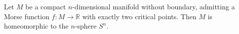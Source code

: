 Let $M$ be a compact $n$-dimensional manifold without boundary, admitting a Morse function $f: M \to \mathbb{R}$ with exactly two critical points. Then $M$ is homeomorphic to the $n$-sphere $S^n$.
